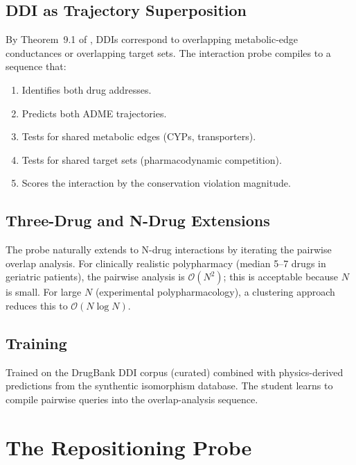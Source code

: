 \documentclass[11pt,twocolumn,a4paper]{article}
\theoremstyle{definition}
\theoremstyle{remark}
\begin{document}
\subsection{DDI as Trajectory Superposition}

By Theorem~9.1 of \citep{sachikonye2025e}, DDIs correspond to overlapping metabolic-edge conductances or overlapping target sets. The interaction probe compiles to a sequence that:
\begin{enumerate}[nosep,label=(\alph*)]
\item Identifies both drug addresses.
\item Predicts both ADME trajectories.
\item Tests for shared metabolic edges (CYPs, transporters).
\item Tests for shared target sets (pharmacodynamic competition).
\item Scores the interaction by the conservation violation magnitude.
\end{enumerate}

\subsection{Three-Drug and N-Drug Extensions}

The probe naturally extends to N-drug interactions by iterating the pairwise overlap analysis. For clinically realistic polypharmacy (median 5--7 drugs in geriatric patients), the pairwise analysis is $\mathcal{O}(N^2)$; this is acceptable because $N$ is small. For large $N$ (experimental polypharmacology), a clustering approach reduces this to $\mathcal{O}(N \log N)$.

\subsection{Training}

Trained on the DrugBank DDI corpus (curated) combined with physics-derived predictions from the synthentic isomorphism database. The student learns to compile pairwise queries into the overlap-analysis sequence.

\section{The Repositioning Probe}
\label{sec:repositioning_probe}
\end{document}
